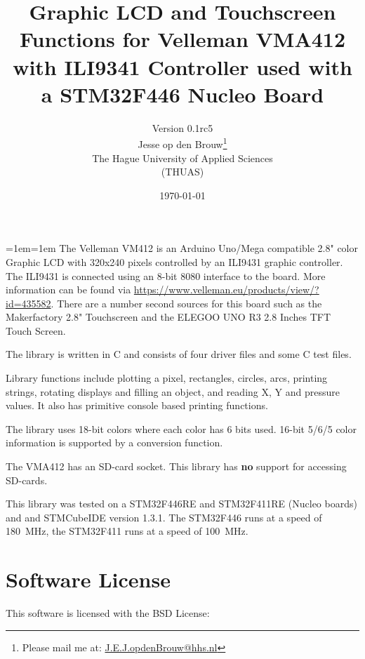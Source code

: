 \documentclass[12pt]{article}
\author{Version 0.1rc5\\[2ex]Jesse op den Brouw\thanks{Please mail me at: \href{mailto:J.E.J.opdenBrouw@hhs.nl}{J.E.J.opdenBrouw@hhs.nl}}\\The Hague University of Applied Sciences\\(THUAS)}
\title{Graphic LCD and Touchscreen Functions for Velleman VMA412 with ILI9341 Controller used with a STM32F446 Nucleo Board}
\date{\today}
\begin{document}
\raggedbottom
\maketitle

\vfill
{\small\leftskip=1em\rightskip=1em
The Velleman VM412 is an Arduino Uno/Mega compatible 2.8" color Graphic LCD with 320x240 pixels controlled by an ILI9431 graphic controller. The ILI9431 is connected using an 8-bit 8080 interface to the board. More information can be found via \url{https://www.velleman.eu/products/view/?id=435582}. There are a number second sources for this board such as the Makerfactory 2.8" Touchscreen and the ELEGOO UNO R3 2.8 Inches TFT Touch Screen.

The library is written in C and consists of four driver files and some C test files.

Library functions include plotting a pixel, rectangles, circles, arcs, printing strings, rotating displays and filling an object, and reading X, Y and pressure values. It also has primitive console based printing functions.

The library uses 18-bit colors where each color has 6 bits used. 16-bit 5/6/5 color information is supported by a conversion function.

The VMA412 has an SD-card socket. This library has \textbf{no} support for accessing SD-cards.

This library was tested on a STM32F446RE and STM32F411RE (Nucleo boards) and and STMCubeIDE version 1.3.1. The STM32F446 runs at a speed of 180~MHz, the STM32F411 runs at  a speed of 100~MHz.

}
\vfill

\newpage

\tableofcontents


\newpage

\section{Software License}
This software is licensed with the BSD License:
\end{document}
